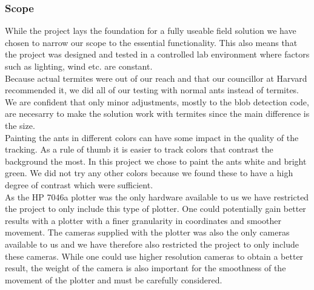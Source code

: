 

\subsubsection{Scope} \mbox{}\par


While the project lays the foundation for a fully useable field solution we have chosen to narrow our scope to the essential functionality. This also means that the project was designed and tested in a controlled lab environment where factors such as lighting, wind etc. are constant. \\

Because actual termites were out of our reach and that our councillor at Harvard recommended it, we did all of our testing with normal ants instead of termites. We are confident that only minor adjustments, mostly to the blob detection code, are necesarry to make the solution work with termites since the main difference is the size. \\

Painting the ants in different colors can have some impact in the quality of the tracking. As a rule of thumb it is easier to track colors that contrast the background the most. In this project we chose to paint the ants white and bright green. We did not try any other colors because we found these to have a high degree of contrast which were sufficient. \\

As the HP 7046a plotter was the only hardware available to us we have restricted the project to only include this type of plotter. One could potentially gain better results with a plotter with a finer granularity in coordinates and smoother movement. The cameras supplied with the plotter was also the only cameras available to us and we have therefore also restricted the project to only include these cameras. While one could use higher resolution cameras to obtain a better result, the weight of the camera is also important for the smoothness of the movement of the plotter and must be carefully considered.\\

